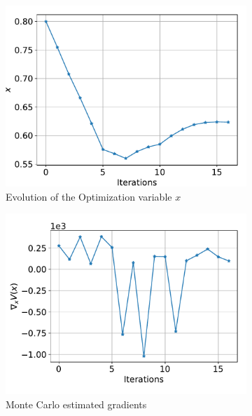 \documentclass[a4paper,11pt]{article}
\begin{document}
\begin{figure}[!htpb]
	\centering
	\begin{subfigure}{0.45\textwidth}
		\includegraphics[width=\textwidth]{fig/X_evolution_opt_2022_10_27-11_09_09_AM.pdf}
		\caption{Evolution of the Optimization variable $x$}
		\label{fig:para_opt_hydration}
	\end{subfigure}
	\hfill
	\begin{subfigure}{0.45\textwidth}
		\includegraphics[width=\textwidth]{fig/x_grad_evolution_opt_2022_10_27-11_09_09_AM.pdf}
		\caption{Monte Carlo estimated gradients}
		\label{fig:grad_opt_hydration}
	\end{subfigure}
	\hfill
	\begin{subfigure}{0.45\textwidth}

\end{subfigure}
\end{figure}
\end{document}
